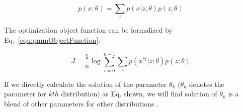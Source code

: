 \documentclass[runningheads,openany]{xhlPaper}
\begin{document}
\begin{equation}
\label{equ:pmmBase}
p\left( {x;\theta } \right) = \sum\limits_z {p\left( {x|z;\theta } \right)p\left( {z;\theta } \right)}
\end{equation}
 
The optimization object function can be formalized by Eq.~\ref{equ:pmmObjectFunction}.

\begin{equation}
\label{equ:pmmObjectFunction}
J = \frac{1}{n}\log \sum\limits_{i = 0}^{n - 1} {\sum\limits_z {p\left( {{x^{*i}}|z;\theta } \right)p\left( {z;\theta } \right)} }
\end{equation}

If we directly calculate the solution of the parameter $\theta_{k}$ ($\theta_k$ denotes the parameter for $kth$ distribution) as Eq. shown, we will find solution of $\theta_k$ is a blend of other parameters for other distributions .
\end{document}
